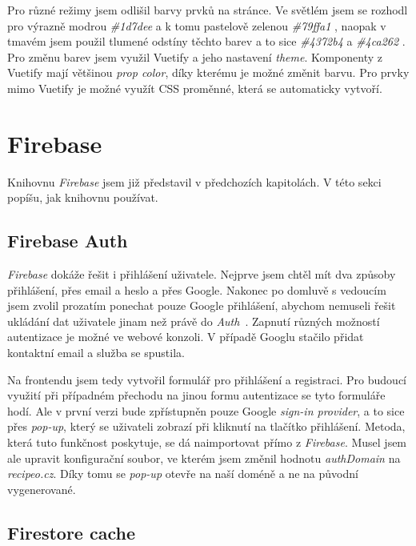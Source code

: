 Pro různé režimy jsem odlišil barvy prvků na stránce. Ve světlém jsem se rozhodl pro výrazně modrou \emph{\#1d7dee}  a k tomu
pastelově zelenou \emph{\#79ffa1}  , naopak v tmavém jsem použil tlumené odstíny těchto barev a to sice \emph{\#4372b4}   a \emph{\#4ca262}  .
Pro změnu barev jsem využil Vuetify a jeho nastavení \emph{theme}. Komponenty z Vuetify mají většinou \emph{prop color}, díky
kterému je možné změnit barvu. Pro prvky mimo Vuetify je možné využít CSS proměnné, která se automaticky vytvoří.

\section{Firebase}

Knihovnu \emph{Firebase} jsem již představil v předchozích kapitolách. V této sekci popíšu, jak knihovnu používat.

\subsection{Firebase Auth}
\emph{Firebase} dokáže řešit i přihlášení uživatele. Nejprve jsem chtěl mít dva způsoby přihlášení, přes email a heslo a přes
Google. Nakonec po domluvě s vedoucím jsem zvolil prozatím ponechat pouze Google přihlášení, abychom nemuseli řešit ukládání
dat uživatele jinam než právě do \emph{Auth}~\cite{FirebaseAuth}. Zapnutí různých možností autentizace je možné ve webové konzoli. V případě Googlu
stačilo přidat kontaktní email a služba se spustila.

Na frontendu jsem tedy vytvořil formulář pro přihlášení a registraci. Pro budoucí využití při případném přechodu na jinou formu
autentizace se tyto formuláře hodí. Ale v první verzi bude zpřístupněn pouze Google \emph{sign-in provider}, a to sice přes \emph{pop-up},
který se uživateli zobrazí při kliknutí na tlačítko přihlášení. Metoda, která tuto funkčnost poskytuje, se dá naimportovat přímo
z \emph{Firebase}. Musel jsem ale upravit konfigurační soubor, ve kterém jsem změnil hodnotu \emph{authDomain} na \emph{recipeo.cz}.
Díky tomu se \emph{pop-up} otevře na naší doméně a ne na původní vygenerované.

\subsection{Firestore cache}
